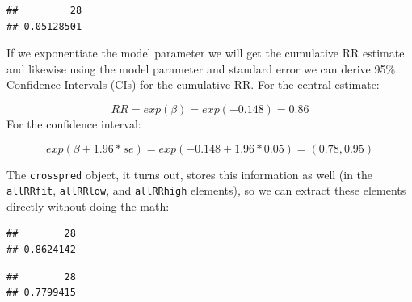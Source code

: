 \documentclass[
]{book}
\newenvironment{Shaded}{\begin{snugshade}}{\end{snugshade}}
\newcommand{\CommentTok}[1]{\textcolor[rgb]{0.56,0.35,0.01}{\textit{#1}}}
\newcommand{\DecValTok}[1]{\textcolor[rgb]{0.00,0.00,0.81}{#1}}
\newcommand{\NormalTok}[1]{#1}
\newcommand{\OperatorTok}[1]{\textcolor[rgb]{0.81,0.36,0.00}{\textbf{#1}}}
\begin{document}
\begin{Shaded}
\end{Shaded}

\begin{verbatim}
##         28 
## 0.05128501
\end{verbatim}

If we exponentiate the model parameter we will get the cumulative RR estimate and likewise using the model parameter and standard error we can derive 95\% Confidence Intervals (CIs) for the cumulative RR. For the central estimate:

\[
RR=exp(\beta)=exp(-0.148)=0.86
\]
For the confidence interval:

\[
exp(\beta \pm 1.96*se) = exp(-0.148 \pm 1.96*0.05) = (0.78, 0.95)
\]

The \texttt{crosspred} object, it turns out, stores this information as well (in the \texttt{allRRfit}, \texttt{allRRlow}, and \texttt{allRRhigh} elements), so we can extract these elements directly without doing the math:

\begin{Shaded}
\end{Shaded}

\begin{verbatim}
##        28 
## 0.8624142
\end{verbatim}

\begin{Shaded}
\end{Shaded}

\begin{verbatim}
##        28 
## 0.7799415
\end{verbatim}
\end{document}
